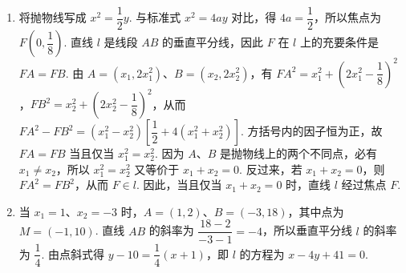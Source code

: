 \begin{solution}
\begin{enumerate}
\item 将抛物线写成 \(x^2=\dfrac12y\). 与标准式 \(x^2=4ay\) 对比，得 \(4a=\dfrac12\)，所以焦点为 \(F\left(0,\dfrac18\right)\). 直线 \(l\) 是线段 \(AB\) 的垂直平分线，因此 \(F\) 在 \(l\) 上的充要条件是 \(FA=FB\). 由 \(A=(x_1,2x_1^2)\)、\(B=(x_2,2x_2^2)\)，有
\(FA^2=x_1^2+\left(2x_1^2-\dfrac18\right)^2\)，\(FB^2=x_2^2+\left(2x_2^2-\dfrac18\right)^2\)，从而
\(FA^2-FB^2=(x_1^2-x_2^2)\left[\dfrac12+4(x_1^2+x_2^2)\right]\).
方括号内的因子恒为正，故 \(FA=FB\) 当且仅当 \(x_1^2=x_2^2\). 因为 \(A\)、\(B\) 是抛物线上的两个不同点，必有 \(x_1\ne x_2\)，所以 \(x_1^2=x_2^2\) 又等价于 \(x_1+x_2=0\). 反过来，若 \(x_1+x_2=0\)，则 \(FA^2=FB^2\)，从而 \(F\in l\). 因此，当且仅当 \(x_1+x_2=0\) 时，直线 \(l\) 经过焦点 \(F\).
\item 当 \(x_1=1\)、\(x_2=-3\) 时，\(A=(1,2)\)、\(B=(-3,18)\)，其中点为 \(M=(-1,10)\). 直线 \(AB\) 的斜率为 \(\dfrac{18-2}{-3-1}=-4\)，所以垂直平分线 \(l\) 的斜率为 \(\dfrac14\). 由点斜式得 \(y-10=\dfrac14(x+1)\)，即 \(l\) 的方程为 \(x-4y+41=0\).
\end{enumerate}
\end{solution}
